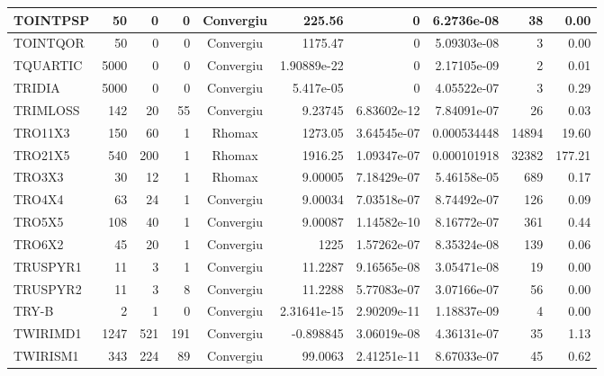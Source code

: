 \begin{center}
\begin{longtable}{|l|r|r|r|c|r|r|r|r|r|}
TOINTPSP &     50 &      0 &      0 & Convergiu  &      225.56 &              0 &  6.2736e-08 &     38 &    0.00 \\ \hline
TOINTQOR &     50 &      0 &      0 & Convergiu  &     1175.47 &              0 & 5.09303e-08 &      3 &    0.00 \\ \hline
TQUARTIC &   5000 &      0 &      0 & Convergiu  & 1.90889e-22 &              0 & 2.17105e-09 &      2 &    0.01 \\ \hline
  TRIDIA &   5000 &      0 &      0 & Convergiu  &   5.417e-05 &              0 & 4.05522e-07 &      3 &    0.29 \\ \hline
TRIMLOSS &    142 &     20 &     55 & Convergiu  &     9.23745 &    6.83602e-12 & 7.84091e-07 &     26 &    0.03 \\ \hline
 TRO11X3 &    150 &     60 &      1 & Rhomax     &     1273.05 &    3.64545e-07 & 0.000534448 &  14894 &   19.60 \\ \hline
 TRO21X5 &    540 &    200 &      1 & Rhomax     &     1916.25 &    1.09347e-07 & 0.000101918 &  32382 &  177.21 \\ \hline
  TRO3X3 &     30 &     12 &      1 & Rhomax     &     9.00005 &    7.18429e-07 & 5.46158e-05 &    689 &    0.17 \\ \hline
  TRO4X4 &     63 &     24 &      1 & Convergiu  &     9.00034 &    7.03518e-07 & 8.74492e-07 &    126 &    0.09 \\ \hline
  TRO5X5 &    108 &     40 &      1 & Convergiu  &     9.00087 &    1.14582e-10 & 8.16772e-07 &    361 &    0.44 \\ \hline
  TRO6X2 &     45 &     20 &      1 & Convergiu  &        1225 &    1.57262e-07 & 8.35324e-08 &    139 &    0.06 \\ \hline
TRUSPYR1 &     11 &      3 &      1 & Convergiu  &     11.2287 &    9.16565e-08 & 3.05471e-08 &     19 &    0.00 \\ \hline
TRUSPYR2 &     11 &      3 &      8 & Convergiu  &     11.2288 &    5.77083e-07 & 3.07166e-07 &     56 &    0.00 \\ \hline
   TRY-B &      2 &      1 &      0 & Convergiu  & 2.31641e-15 &    2.90209e-11 & 1.18837e-09 &      4 &    0.00 \\ \hline
TWIRIMD1 &   1247 &    521 &    191 & Convergiu  &   -0.898845 &    3.06019e-08 & 4.36131e-07 &     35 &    1.13 \\ \hline
TWIRISM1 &    343 &    224 &     89 & Convergiu  &     99.0063 &    2.41251e-11 & 8.67033e-07 &     45 &    0.62 \\ \hline

\end{longtable}
\end{center}
